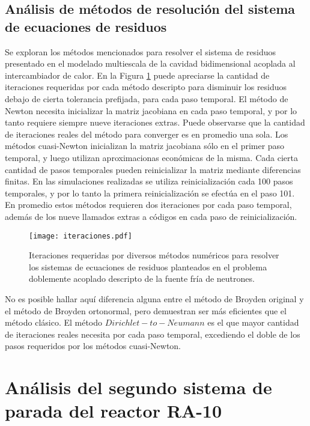 \subsection*{Análisis de métodos de resolución del sistema de ecuaciones de residuos}

Se exploran los métodos mencionados para resolver el sistema de residuos presentado
en el modelado multiescala de la cavidad bidimensional acoplada al intercambiador de calor.
En la Figura \ref{iteraciones_ri} puede apreciarse la cantidad de iteraciones requeridas 
por cada método descripto para disminuir los residuos debajo de cierta tolerancia prefijada, para cada paso temporal.
El método de Newton necesita inicializar la matriz jacobiana en cada paso temporal, y por lo tanto requiere siempre nueve iteraciones extras.
Puede observarse que la cantidad de iteraciones reales del método para converger es en promedio una sola.
Los métodos cuasi-Newton inicializan la matriz jacobiana sólo en el primer paso temporal,
y luego utilizan aproximacionas económicas de la misma. 
Cada cierta cantidad de pasos temporales pueden reinicializar la matriz mediante diferencias finitas. 
En las simulaciones realizadas se utiliza reinicialización cada 100 pasos temporales, 
y por lo tanto la primera reinicialización se efectúa en el paso 101.
En promedio estos métodos requieren dos iteraciones por cada paso temporal, 
además de los nueve llamados extras a códigos en cada paso de reinicialización.

\begin{figure}['ht]
\centering{}\texttt{[image: iteraciones.pdf]}
\caption{Iteraciones requeridas por diversos métodos numéricos para resolver los sistemas de ecuaciones de residuos planteados
 en el problema doblemente acoplado descripto de la fuente fría de neutrones.} \label{iteraciones_ri} 
\end{figure}

No es posible hallar aquí diferencia alguna entre el método de Broyden original y el método de Broyden ortonormal,
pero demuestran ser más eficientes que el método clásico.
El método $Dirichlet-to-Neumann$ es el que mayor cantidad de iteraciones reales necesita por cada paso temporal, 
excediendo el doble de los pasos requeridos por los métodos cuasi-Newton.

\section{Análisis del segundo sistema de parada del reactor RA-10}
\label{3:ra10}

